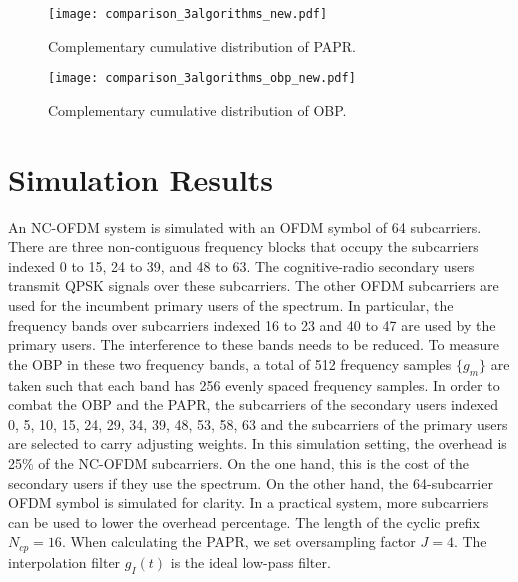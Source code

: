 \documentclass[paper]{ieice}
\begin{document}
\begin{figure}[t]
	\begin{center}
	\texttt{[image: comparison\_3algorithms\_new.pdf]}
      \end{center}
	\caption{Complementary cumulative distribution of PAPR.}
	\label{fig:comparison_3algorithms}
\end{figure}


\begin{figure}[t]
\begin{center}
\texttt{[image: comparison\_3algorithms\_obp\_new.pdf]}
\end{center}
\caption{Complementary cumulative distribution of OBP.}
\label{fig:comparison_3algorithms_obp}
\end{figure}


\section{Simulation Results} \label{sec:NumericalResults}


An NC-OFDM system is simulated with an OFDM symbol of 64 subcarriers.  There are three non-contiguous frequency blocks that occupy the subcarriers indexed 0 to 15, 24 to 39, and 48 to 63.   The cognitive-radio secondary users transmit QPSK signals over these subcarriers.  The other OFDM subcarriers are used for the incumbent primary users of the spectrum.  In particular, the frequency bands over subcarriers indexed 16 to 23 and 40 to 47 are used by the primary users. The interference to these bands needs to be reduced.  To measure the OBP in these two frequency bands, a total of 512 frequency samples $\{g_{m}\}$ are taken such that each band has 256 evenly spaced frequency samples.
In order to combat the OBP and the PAPR, the subcarriers of the secondary users indexed 0, 5, 10, 15, 24, 29, 34, 39, 48, 53, 58, 63 and the subcarriers of the primary users are selected to carry adjusting weights.  In this simulation setting, the overhead is 25\% of the NC-OFDM subcarriers.  On the one hand, this is the cost of the secondary users if they use the spectrum.  On the other hand, the 64-subcarrier OFDM symbol is simulated for clarity.  In a practical system, more subcarriers can be used to lower the overhead percentage. The length of the cyclic prefix $N_{cp} = 16$. When calculating the PAPR, we set oversampling factor $J = 4$. The interpolation filter $g_I(t)$ is the ideal low-pass filter.
\end{document}
